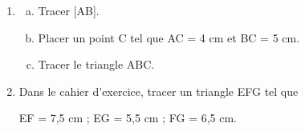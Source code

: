 \documentclass[../main.tex]{subfiles}
\begin{document}
\begingroup\small\vspace{10pt}
    \begin{center}
    \end{center}
    \begin{enumerate}[1), font=\bfseries]
        \item
            \begin{enumerate}[a), font=\bfseries]
                \item Tracer [AB].
                \item Placer un point C tel que AC = 4 cm et BC = 5 cm.
                \item Tracer le triangle ABC.
            \end{enumerate}
        \item Dans le cahier d'exercice, tracer un triangle EFG tel que
            \begin{center}
                \centering EF = 7,5 cm ; EG = 5,5 cm ; FG = 6,5 cm.
            \end{center}
    \end{enumerate}\endgroup
\end{document}
